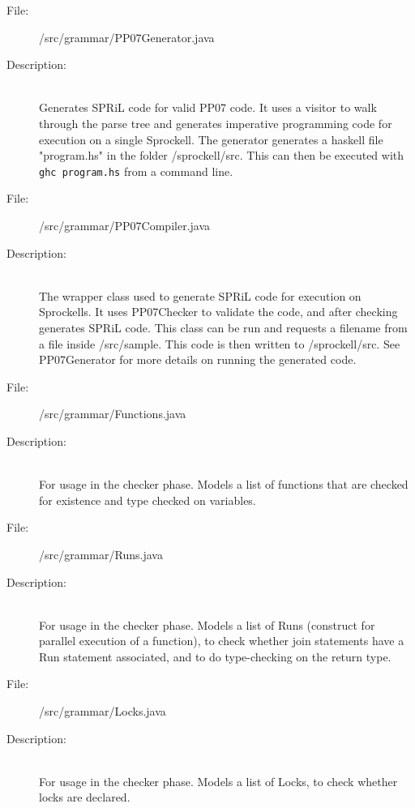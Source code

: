\documentclass[10pt,a4paper]{report}
\begin{document}
\begin{description}
	\item[File:] /src/grammar/PP07Generator.java
	\item[Description:] \hfill \\
		Generates SPRiL code for valid PP07 code. It uses a visitor to walk through the parse tree and generates imperative programming code for execution on a single Sprockell. The generator generates a haskell file "program.hs" in the folder /sprockell/src. This can then be executed with \texttt{ghc program.hs} from a command line.
\end{description}

\begin{description}
	\item[File:] /src/grammar/PP07Compiler.java
	\item[Description:] \hfill \\
		The wrapper class used to generate SPRiL code for execution on Sprockells. It uses PP07Checker to validate the code, and after checking generates SPRiL code. This class can be run and requests a filename from a file inside /src/sample. This code is then written to /sprockell/src. See PP07Generator for more details on running the generated code. 
\end{description}

\begin{description}
	\item[File:] /src/grammar/Functions.java
	\item[Description:] \hfill \\
		For usage in the checker phase. Models a list of functions that are checked for existence and type checked on variables.  
\end{description}

\begin{description}
	\item[File:] /src/grammar/Runs.java
	\item[Description:] \hfill \\
		For usage in the checker phase. Models a list of Runs (construct for parallel execution of a function), to check whether join statements have a Run statement associated, and to do type-checking on the return type.
\end{description}

\begin{description}
	\item[File:] /src/grammar/Locks.java
	\item[Description:] \hfill \\
		For usage in the checker phase. Models a list of Locks, to check whether locks are declared.
\end{description}
\end{document}
